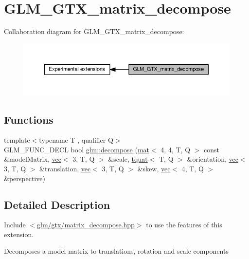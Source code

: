 \hypertarget{group__gtx__matrix__decompose}{}\section{G\+L\+M\+\_\+\+G\+T\+X\+\_\+matrix\+\_\+decompose}
\label{group__gtx__matrix__decompose}
Collaboration diagram for G\+L\+M\+\_\+\+G\+T\+X\+\_\+matrix\+\_\+decompose\+:
\nopagebreak
\begin{figure}[H]
\begin{center}
\leavevmode
\includegraphics[width=350pt]{d3/dfe/group__gtx__matrix__decompose}
\end{center}
\end{figure}
\subsection*{Functions}
\begin{DoxyCompactItemize}
\item 
{\footnotesize template$<$typename T , qualifier Q$>$ }\\G\+L\+M\+\_\+\+F\+U\+N\+C\+\_\+\+D\+E\+CL bool \hyperlink{group__gtx__matrix__decompose_ga91185463739c855d602596907a9994bc}{glm\+::decompose} (\hyperlink{structglm_1_1mat}{mat}$<$ 4, 4, T, Q $>$ const \&model\+Matrix, \hyperlink{structglm_1_1vec}{vec}$<$ 3, T, Q $>$ \&scale, \hyperlink{structglm_1_1tquat}{tquat}$<$ T, Q $>$ \&orientation, \hyperlink{structglm_1_1vec}{vec}$<$ 3, T, Q $>$ \&translation, \hyperlink{structglm_1_1vec}{vec}$<$ 3, T, Q $>$ \&skew, \hyperlink{structglm_1_1vec}{vec}$<$ 4, T, Q $>$ \&perspective)
\end{DoxyCompactItemize}


\subsection{Detailed Description}
Include $<$\hyperlink{matrix__decompose_8hpp}{glm/gtx/matrix\+\_\+decompose.\+hpp}$>$ to use the features of this extension.

Decomposes a model matrix to translations, rotation and scale components 

